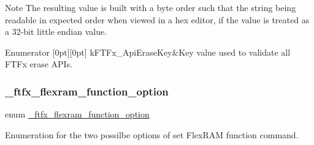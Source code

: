 \begin{DoxyNote}{Note}
The resulting value is built with a byte order such that the string being readable in expected order when viewed in a hex editor, if the value is treated as a 32-\/bit little endian value. 
\end{DoxyNote}
\begin{DoxyEnumFields}{Enumerator}
[0pt][0pt]{}\mbox{\label{group__ftfx__controller_ggaaed04d931a32adf243a57f5e6d56da2da14949b7fee40a9d02fac191828f5f899}} 
k\+F\+T\+Fx\+\_\+\+Api\+Erase\+Key&Key value used to validate all F\+T\+Fx erase A\+P\+Is. \\
\hline

\end{DoxyEnumFields}
\mbox{\label{group__ftfx__controller_ga800c3413ac2380e1d63505c39eeec9b8}} 
\subsubsection{\texorpdfstring{\_ftfx\_flexram\_function\_option}{\_ftfx\_flexram\_function\_option}}
{\footnotesize\ttfamily enum \mbox{\hyperlink{group__ftfx__controller_ga800c3413ac2380e1d63505c39eeec9b8}{\+\_\+ftfx\+\_\+flexram\+\_\+function\+\_\+option}}}



Enumeration for the two possilbe options of set Flex\+R\+AM function command. 

